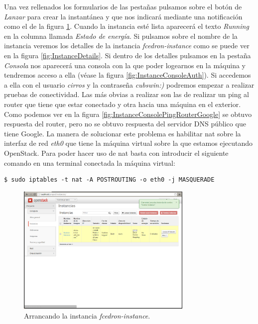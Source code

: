 \documentclass{article}
\begin{document}
	Una vez rellenados los formularios de las pestañas pulsamos sobre el botón de \emph{Lanzar} para crear la instantánea y que nos indicará mediante una notificación como el de la figura \ref{fig:InstanceLaunching}. Cuando la instancia esté lista aparecerá el texto \emph{Running} en la columna llamada \emph{Estado de energía}. Si pulsamos sobre el nombre de la instancia veremos los detalles de la instancia \emph{fcedron-instance} como se puede ver en la figura \ref{fig:InstanceDetails}. Si dentro de los detalles pulsamos en la pestaña \emph{Consola} nos aparecerá una consola con la que poder logearnos en la máquina y tendremos acceso a ella (véase la figura \ref{fig:InstanceConsoleAuth}). Si accedemos a ella con el usuario \emph{cirros} y la contraseña \emph{cubswin:)} podremos empezar a realizar pruebas de conectividad. Las más obvias a realizar son las de realizar un ping al router que tiene que estar conectado y otra hacia una máquina en el exterior. Como podemos ver en la figura \ref{fig:InstanceConsolePingRouterGoogle} se obtuvo respuesta del router, pero no se obtuvo respuesta del servidor DNS público que tiene Google. La manera de solucionar este problema es habilitar nat sobre la interfaz de red \emph{eth0} que tiene la máquina virtual sobre la que estamos ejecutando OpenStack. Para poder hacer uso de nat basta con introducir el siguiente comando en una terminal conectada la máquina virtual:
\begin{lstlisting}[style=miniBash]
$ sudo iptables -t nat -A POSTROUTING -o eth0 -j MASQUERADE
\end{lstlisting}		

\begin{figure}[h]
  \centering
    \includegraphics[width=0.75\textwidth]{img/m_041.png}
  \caption{Arrancando la instancia \emph{fcedron-instance}.}
  \label{fig:InstanceLaunching}
\end{figure}	
\end{document}
